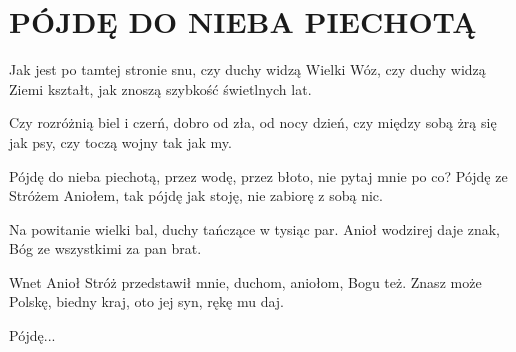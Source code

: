 \documentclass[../../../songbook.tex]{subfiles}
\begin{document}
\TabPositions{8cm} %
\section*{PÓJDĘ DO NIEBA PIECHOTĄ}
{}
\vspace{0.5cm}
Jak jest po tamtej stronie snu,		 \newline
czy duchy widzą Wielki Wóz,			 \newline
czy duchy widzą Ziemi kształt,		 \newline
jak znoszą szybkość świetlnych lat.	 \newline

Czy rozróżnią biel i czerń, \newline
dobro od zła, od nocy dzień, \newline
czy między sobą żrą się jak psy, \newline
czy toczą wojny tak jak my. \newline

\-\hspace{1cm} Pójdę do nieba piechotą,		 \newline
\-\hspace{1cm} przez wodę, przez błoto,		 \newline
\-\hspace{1cm} nie pytaj mnie po co?		 \newline
\-\hspace{1cm} Pójdę ze Stróżem Aniołem,	 \newline
\-\hspace{1cm} tak pójdę jak stoję,			 \newline
\-\hspace{1cm} nie zabiorę z sobą nic.		 \newline

Na powitanie wielki bal, \newline
duchy tańczące w tysiąc par. \newline
Anioł wodzirej daje znak, \newline
Bóg ze wszystkimi za pan brat. \newline

Wnet Anioł Stróż przedstawił mnie, \newline
duchom, aniołom, Bogu też. \newline
Znasz może Polskę, biedny kraj, \newline
oto jej syn, rękę mu daj. \newline 

\-\hspace{1cm} Pójdę... \newline
\end{document}

